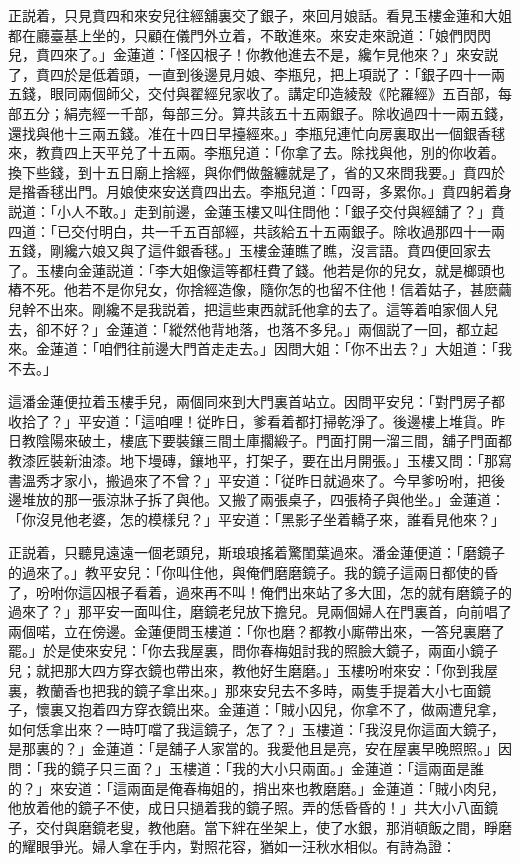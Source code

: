正説着，只見賁四和來安兒往經舖裏交了銀子，來回月娘話。看見玉樓金蓮和大姐都在廳臺基上坐的，只顧在儀門外立着，不敢進來。來安走來說道：「娘們閃閃兒，賁四來了。」金蓮道：「怪囚根子！你教他進去不是，纔乍見他來？」來安説了，賁四於是低着頭，一直到後邊見月娘、李瓶兒，把上項説了：「銀子四十一兩五錢，眼同兩個師父，交付與翟經兒家收了。講定印造綾殼《陀羅經》五百部，每部五分；絹売經一千部，每部三分。算共該五十五兩銀子。除收過四十一兩五錢，還找與他十三兩五錢。准在十四日早擡經來。」李瓶兒連忙向房裏取出一個銀香毬來，教賁四上天平兑了十五兩。李瓶兒道：「你拿了去。除找與他，別的你收着。換下些錢，到十五日廟上捨經，與你們做盤纏就是了，省的又來問我要。」賁四於是揝香毬出門。月娘使來安送賁四出去。李瓶兒道：「四哥，多累你。」賁四躬着身説道：「小人不敢。」走到前邊，金蓮玉樓又叫住問他：「銀子交付與經舖了？」賁四道：「已交付明白，共一千五百部經，共該給五十五兩銀子。除收過那四十一兩五錢，剛纔六娘又與了這件銀香毬。」玉樓金蓮瞧了瞧，沒言語。賁四便回家去了。玉樓向金蓮説道：「李大姐像這等都枉費了錢。他若是你的兒女，就是榔頭也樁不死。他若不是你兒女，你捨經造像，隨你怎的也留不住他！信着姑子，甚麽繭兒幹不出來。剛纔不是我説着，把這些東西就託他拿的去了。這等着咱家個人兒去，卻不好？」金蓮道：「縱然他背地落，也落不多兒。」兩個説了一回，都立起來。金蓮道：「咱們往前邊大門首走走去。」因問大姐：「你不出去？」大姐道：「我不去。」

這潘金蓮便拉着玉樓手兒，兩個同來到大門裏首站立。因問平安兒：「對門房子都收拾了？」平安道：「這咱哩！従昨日，爹看着都打掃乾淨了。後邊樓上堆貨。昨日教陰陽來破土，樓底下要裝鑲三間土庫擱緞子。門面打開一溜三間，舖子門面都教漆匠裝新油漆。地下墁磚，鑲地平，打架子，要在出月開張。」玉樓又問：「那寫書溫秀才家小，搬過來了不曾？」平安道：「従昨日就過來了。今早爹吩咐，把後邊堆放的那一張涼牀子拆了與他。又搬了兩張桌子，四張椅子與他坐。」金蓮道：「你沒見他老婆，怎的模樣兒？」平安道：「黑影子坐着轎子來，誰看見他來？」

正説着，只聽見遠遠一個老頭兒，斯琅琅搖着驚閨葉過來。潘金蓮便道：「磨鏡子的過來了。」教平安兒：「你叫住他，與俺們磨磨鏡子。我的鏡子這兩日都使的昏了，吩咐你這囚根子看着，過來再不叫！俺們出來站了多大囬，怎的就有磨鏡子的過來了？」那平安一面叫住，磨鏡老兒放下擔兒。見兩個婦人在門裏首，向前唱了兩個喏，立在傍邊。金蓮便問玉樓道：「你也磨？都教小廝帶出來，一答兒裏磨了罷。」於是使來安兒：「你去我屋裏，問你春梅姐討我的照臉大鏡子，兩面小鏡子兒；就把那大四方穿衣鏡也帶出來，教他好生磨磨。」玉樓吩咐來安：「你到我屋裏，教蘭香也把我的鏡子拿出來。」那來安兒去不多時，兩隻手提着大小七面鏡子，懷裏又抱着四方穿衣鏡出來。金蓮道：「賊小囚兒，你拿不了，做兩遭兒拿，如何恁拿出來？一時叮噹了我這鏡子，怎了？」玉樓道：「我沒見你這面大鏡子，是那裏的？」金蓮道：「是舖子人家當的。我愛他且是亮，安在屋裏早晚照照。」因問：「我的鏡子只三面？」玉樓道：「我的大小只兩面。」金蓮道：「這兩面是誰的？」來安道：「這兩面是俺春梅姐的，捎出來也教磨磨。」金蓮道：「賊小肉兒，他放着他的鏡子不使，成日只撾着我的鏡子照。弄的恁昏昏的！」共大小八面鏡子，交付與磨鏡老叟，教他磨。當下絆在坐架上，使了水銀，那消頓飯之間，睜磨的耀眼爭光。婦人拿在手内，對照花容，猶如一汪秋水相似。有詩為證：

